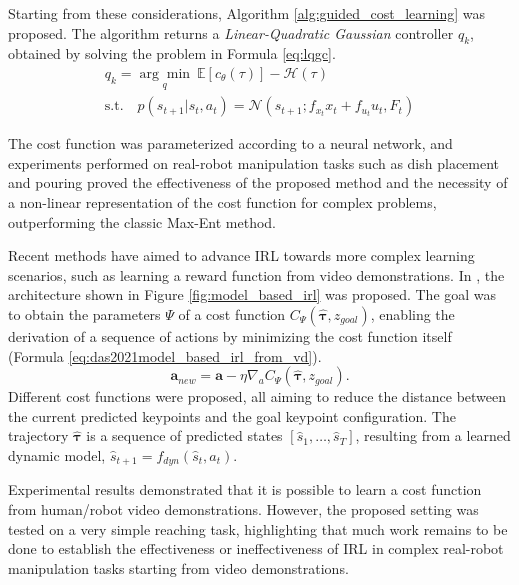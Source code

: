 Starting from these considerations, Algorithm \ref{alg:guided_cost_learning} was proposed. The algorithm returns a \textit{Linear-Quadratic Gaussian} \cite{levine2014lqr_flm} controller $q_{k}$, obtained by solving the problem in Formula \ref{eq:lqgc}.
\begin{equation}
    \label{eq:lqgc}
    \begin{aligned}
    q_{k} = \underset{q}{\arg \min} \ \mathbb{E}[c_{\theta}(\tau)] - \mathcal{H}(\tau) \quad \\ \text{s.t.} \quad p(s_{t+1}|s_{t},a_{t}) = \mathcal{N}(s_{t+1}; f_{x_t}x_{t}+f_{u_t}u_{t}, F_{t})
    \end{aligned}
\end{equation}

The cost function was parameterized according to a neural network, and experiments performed on real-robot manipulation tasks such as dish placement and pouring proved the effectiveness of the proposed method and the necessity of a non-linear representation of the cost function for complex problems, outperforming the classic Max-Ent method.

Recent methods have aimed to advance IRL towards more complex learning scenarios, such as learning a reward function from video demonstrations. In \cite{das2021model_based_irl_from_vd}, the architecture shown in Figure \ref{fig:model_based_irl} was proposed. The goal was to obtain the parameters $\Psi$ of a cost function $C_{\Psi}(\hat{\boldsymbol{\tau}}, z_{goal})$, enabling the derivation of a sequence of actions by minimizing the cost function itself (Formula \ref{eq:das2021model_based_irl_from_vd}).
\begin{equation}
\label{eq:das2021model_based_irl_from_vd}
\textbf{a}_{new} = \textbf{a} - \eta \nabla_{a} C_{\Psi}(\hat{\boldsymbol{\tau}}, z_{goal}).
\end{equation}
Different cost functions were proposed, all aiming to reduce the distance between the current predicted keypoints and the goal keypoint configuration. The trajectory $\hat{\boldsymbol{\tau}}$ is a sequence of predicted states $[\hat{s}_{1}, \dots, \hat{s}_{T}]$, resulting from a learned dynamic model, $\hat{s}_{t+1} = f_{dyn}(\hat{s}_{t}, a_{t})$. 

Experimental results demonstrated that it is possible to learn a cost function from human/robot video demonstrations. However, the proposed setting was tested on a very simple reaching task, highlighting that much work remains to be done to establish the effectiveness or ineffectiveness of IRL in complex real-robot manipulation tasks starting from video demonstrations.

